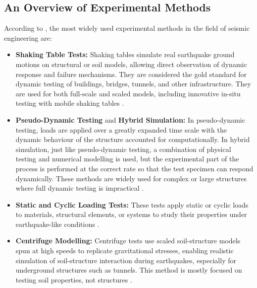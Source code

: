 \documentclass[9pt]{extarticle}
\begin{document}
\subsection{An Overview of Experimental Methods}
According to \cite{williams2001}, the most widely used experimental methods in the field of seismic engineering are:
\begin{itemize}
    \item \textbf{Shaking Table Tests:} Shaking tables simulate real earthquake ground motions on structural or soil models, allowing direct observation of dynamic response and failure mechanisms. They are considered the gold standard for dynamic testing of buildings, bridges, tunnels, and other infrastructure. 
    They are used for both full-scale and scaled models, including innovative in-situ testing with mobile shaking tables \citep{williams2001,Bousias2017Experimental,Abovyan2024Method,Tsinidis2020Seismic,DeFelice2016Methods,El-Emam2018Experimental}. 

    \item \textbf{Pseudo-Dynamic Testing} and \textbf{Hybrid Simulation:} In pseudo-dynamic testing, loads are applied over a greatly expanded time scale with the dynamic behaviour of the structure accounted for computationally. In hybrid simulation, just like pseudo-dynamic testing, a combination of physical testing and numerical modelling is used, but the experimental part of the process is performed at the correct rate so that the test specimen can respond dynamically. These methods are widely used for complex or large structures where full dynamic testing is impractical \citep{williams2001,Bousias2017Experimental}.

    \item \textbf{Static and Cyclic Loading Tests:} These tests apply static or cyclic loads to materials, structural elements, or systems to study their properties under earthquake-like conditions \citep{williams2001,Bousias2017Experimental,Fiorino2016Experimental}.

    \item \textbf{Centrifuge Modelling:} Centrifuge tests use scaled soil-structure models spun at high speeds to replicate gravitational stresses, enabling realistic simulation of soil-structure interaction during earthquakes, especially for underground structures such as tunnels. This method is mostly focused on testing soil properties, not structures \citep{williams2001,Tsinidis2020Seismic}.


\end{itemize}
\end{document}
